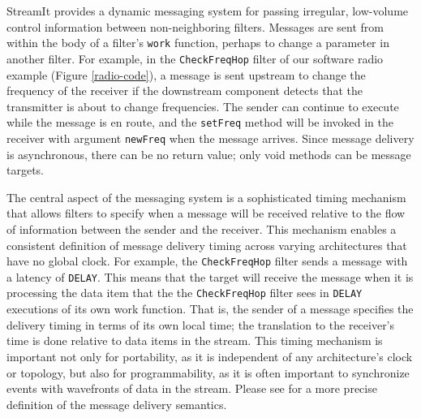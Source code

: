 \documentclass{sig-alternate}
\begin{document}
StreamIt provides a dynamic messaging system for passing irregular,
low-volume control information between non-neighboring filters.
Messages are sent from within the body of a filter's {\tt work}
function, perhaps to change a parameter in another filter.  For
example, in the {\tt CheckFreqHop} filter of our software radio
example (Figure \ref{radio-code}), a message is sent upstream to
change the frequency of the receiver if the downstream component
detects that the transmitter is about to change frequencies.  The
sender can continue to execute while the message is en route, and the
{\tt setFreq} method will be invoked in the receiver with argument
{\tt newFreq} when the message arrives.  Since message delivery is
asynchronous, there can be no return value; only void methods can be
message targets.

The central aspect of the messaging system is a sophisticated timing
mechanism that allows filters to specify when a message will be
received relative to the flow of information between the sender and
the receiver.  This mechanism enables a consistent definition of
message delivery timing across varying architectures that have no
global clock.  For example, the {\tt CheckFreqHop} filter sends a
message with a latency of {\tt DELAY}.  This means that the target
will receive the message when it is processing the data item that the
the {\tt CheckFreqHop} filter sees in {\tt DELAY} executions of its
own work function.  That is, the sender of a message specifies the
delivery timing in terms of its own local time; the translation to the
receiver's time is done relative to data items in the stream.  This
timing mechanism is important not only for portability, as it is
independent of any architecture's clock or topology, but also for
programmability, as it is often important to synchronize events with
wavefronts of data in the stream.  Please see \cite{streamittech} for
a more precise definition of the message delivery semantics.

\end{document}
